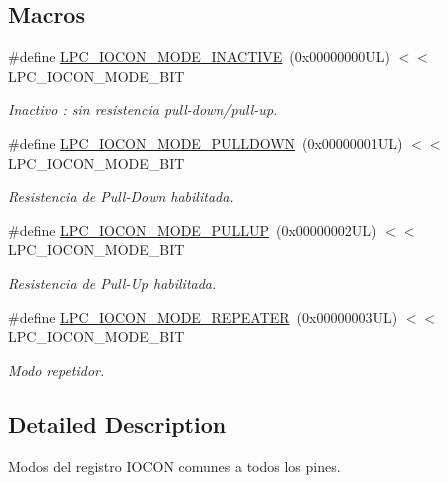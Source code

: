 \subsection*{Macros}
\begin{DoxyCompactItemize}
\item 
\#define \hyperlink{group___l_p_c___i_o_c_o_n___l_p_c1102___m_o_d_e_gac0cfc0275160b96c647fc5774f34b390}{L\+P\+C\+\_\+\+I\+O\+C\+O\+N\+\_\+\+M\+O\+D\+E\+\_\+\+I\+N\+A\+C\+T\+I\+VE}~(0x00000000\+U\+L) $<$$<$ L\+P\+C\+\_\+\+I\+O\+C\+O\+N\+\_\+\+M\+O\+D\+E\+\_\+\+B\+IT
\begin{DoxyCompactList}\small\item\em Inactivo \+: sin resistencia pull-\/down/pull-\/up. \end{DoxyCompactList}\item 
\#define \hyperlink{group___l_p_c___i_o_c_o_n___l_p_c1102___m_o_d_e_gac740c9895b3d9f1c49a902a7693b3ef4}{L\+P\+C\+\_\+\+I\+O\+C\+O\+N\+\_\+\+M\+O\+D\+E\+\_\+\+P\+U\+L\+L\+D\+O\+WN}~(0x00000001\+U\+L) $<$$<$ L\+P\+C\+\_\+\+I\+O\+C\+O\+N\+\_\+\+M\+O\+D\+E\+\_\+\+B\+IT
\begin{DoxyCompactList}\small\item\em Resistencia de Pull-\/\+Down habilitada. \end{DoxyCompactList}\item 
\#define \hyperlink{group___l_p_c___i_o_c_o_n___l_p_c1102___m_o_d_e_ga36c30fc68af8e4dfdda3ed4116bbb9e1}{L\+P\+C\+\_\+\+I\+O\+C\+O\+N\+\_\+\+M\+O\+D\+E\+\_\+\+P\+U\+L\+L\+UP}~(0x00000002\+U\+L) $<$$<$ L\+P\+C\+\_\+\+I\+O\+C\+O\+N\+\_\+\+M\+O\+D\+E\+\_\+\+B\+IT
\begin{DoxyCompactList}\small\item\em Resistencia de Pull-\/\+Up habilitada. \end{DoxyCompactList}\item 
\#define \hyperlink{group___l_p_c___i_o_c_o_n___l_p_c1102___m_o_d_e_ga622cda7f7867ff277096fe6ccb94d046}{L\+P\+C\+\_\+\+I\+O\+C\+O\+N\+\_\+\+M\+O\+D\+E\+\_\+\+R\+E\+P\+E\+A\+T\+ER}~(0x00000003\+U\+L) $<$$<$ L\+P\+C\+\_\+\+I\+O\+C\+O\+N\+\_\+\+M\+O\+D\+E\+\_\+\+B\+IT
\begin{DoxyCompactList}\small\item\em Modo repetidor. \end{DoxyCompactList}\end{DoxyCompactItemize}


\subsection{Detailed Description}
Modos del registro I\+O\+C\+ON comunes a todos los pines. 



